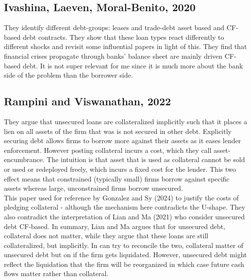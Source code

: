 \documentclass[12pt]{article}
\begin{document}
\subsection*{Ivashina, Laeven, Moral-Benito, 2020}
They identify different debt-groups: leases and trade-debt asset based and CF-based debt contracts. They show that these loan types react differently to different shocks and revisit some influential papers in light of this. They find that financial crises propagate through banks' balance sheet are mainly driven CF-based debt. It is not super relevant for me since it is much more about the bank side of the problem than the borrower side. 

\subsection*{Rampini and Viswanathan, 2022 \checkmark}
They argue that unsecured loans are collateralized implicitly such that it places a lien on all assets of the firm that was is not secured in other debt. Explicitly securing debt allows firms to borrow more against their assets as it eases lender enforcement. However posting collateral incurs a cost, which they call asset-encumbrance. The intuition is that asset that is used as collateral cannot be sold or used or redeployed freely, which incurs a fixed cost for the lender. This two effect means that constrained (typically small) firms borrow against specific assets whereas large, unconstrained firms borrow unsecured. \vspace*{3mm} \\ 
This paper used for reference by Gonzalez and Sy (2024) to justify the costs of pledging collateral - although the mechanism here contradicts the U-shape. They also contradict the interpretation of Lian and Ma (2021) who consider unsecured debt CF-based. In summary, Lian and Ma argues that for unsecured debt, collateral does not matter, while they argue that these loans are still collateralized, but implicitly. In can try to reconcile the two, collateral matter of unsecured debt but on if the firm gets liquidated. However, unsecured debt might reflect the liquidation that the firm will be reorganized in which case future cash flows matter rather than collateral. 
\end{document}
